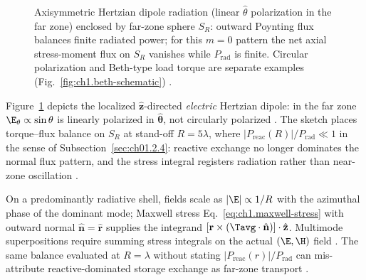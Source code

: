 \begin{figure}[b]
\centering
{}
\caption{Axisymmetric Hertzian dipole radiation (linear $\hat{\theta}$ polarization in the far zone) enclosed by far-zone sphere $S_R$: outward Poynting flux balances finite radiated power; for this $m{=}0$ pattern the net axial stress-moment flux on $S_R$ vanishes while $P_{\mathrm{rad}}$ is finite. Circular polarization and Beth-type load torque are separate examples (Fig.~\ref{fig:ch1.beth-schematic}) \cite{stratton1941,beth1936}.}
\label{fig:ch1.ex61-beth-helical-sketch}
\end{figure}

Figure~\ref{fig:ch1.ex61-beth-helical-sketch} depicts the localized $\hat{\mathbf{z}}$-directed \emph{electric} Hertzian dipole: in the far zone $\E_\theta\propto\sin\theta$ is linearly polarized in $\hat{\boldsymbol{\theta}}$, not circularly polarized \cite{stratton1941,harrington2001}. The sketch places torque--flux balance on $S_R$ at stand-off \(R=5\lambda\), where \(|P_{\mathrm{reac}}(R)|/P_{\mathrm{rad}}\ll 1\) in the sense of Subsection~\ref{sec:ch01.2.4}: reactive exchange no longer dominates the normal flux pattern, and the stress integral registers radiation rather than near-zone oscillation \cite{stratton1941}.

On a predominantly radiative shell, fields scale as \(|\E|\propto 1/R\) with the azimuthal phase of the dominant mode; Maxwell stress Eq.~\eqref{eq:ch1.maxwell-stress} with outward normal \(\hat{\mathbf{n}}=\hat{\mathbf{r}}\) supplies the integrand \([\mathbf{r}\times(\Tavg\cdot\hat{\mathbf{n}})]\cdot\hat{\mathbf{z}}\). Multimode superpositions require summing stress integrals on the actual $(\E,\H)$ field \cite{stratton1941}. The same balance evaluated at \(R=\lambda\) without stating \(|P_{\mathrm{reac}}(r)|/P_{\mathrm{rad}}\) can mis-attribute reactive-dominated storage exchange as far-zone transport \cite{stratton1941}.

